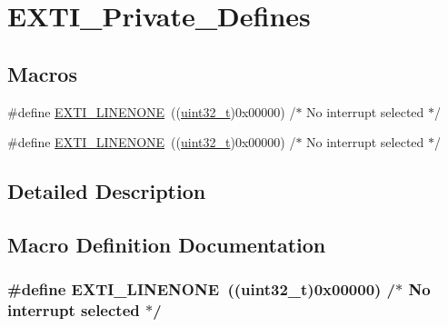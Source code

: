 \hypertarget{group___e_x_t_i___private___defines}{}\section{E\+X\+T\+I\+\_\+\+Private\+\_\+\+Defines}
\label{group___e_x_t_i___private___defines}
\subsection*{Macros}
\begin{DoxyCompactItemize}
\item 
\#define \hyperlink{group___e_x_t_i___private___defines_ga4451b67e337fc341394ee695273798af}{E\+X\+T\+I\+\_\+\+L\+I\+N\+E\+N\+O\+NE}~((\hyperlink{_p_e___types_8h_a33594304e786b158f3fb30289278f5af}{uint32\+\_\+t})0x00000)  /$\ast$ No interrupt selected $\ast$/
\item 
\#define \hyperlink{group___e_x_t_i___private___defines_ga4451b67e337fc341394ee695273798af}{E\+X\+T\+I\+\_\+\+L\+I\+N\+E\+N\+O\+NE}~((\hyperlink{_p_e___types_8h_a33594304e786b158f3fb30289278f5af}{uint32\+\_\+t})0x00000)  /$\ast$ No interrupt selected $\ast$/
\end{DoxyCompactItemize}


\subsection{Detailed Description}


\subsection{Macro Definition Documentation}
\subsubsection[{\texorpdfstring{E\+X\+T\+I\+\_\+\+L\+I\+N\+E\+N\+O\+NE}{EXTI_LINENONE}}]{\setlength{\rightskip}{0pt plus 5cm}\#define E\+X\+T\+I\+\_\+\+L\+I\+N\+E\+N\+O\+NE~(({\bf uint32\+\_\+t})0x00000)  /$\ast$ No interrupt selected $\ast$/}\hypertarget{group___e_x_t_i___private___defines_ga4451b67e337fc341394ee695273798af}{}\label{group___e_x_t_i___private___defines_ga4451b67e337fc341394ee695273798af}


